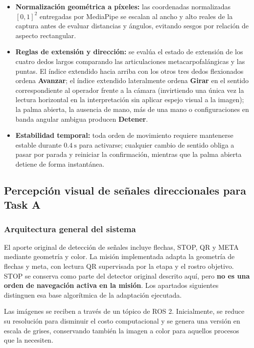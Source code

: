 \documentclass[11pt,a4paper]{article}
\begin{document}
\begin{itemize}
  \item \textbf{Normalización geométrica a píxeles:} las coordenadas
  normalizadas $[0,1]^2$ entregadas por MediaPipe se escalan al ancho y alto
  reales de la captura antes de evaluar distancias y ángulos, evitando sesgos
  por relación de aspecto rectangular.
  \item \textbf{Reglas de extensión y dirección:} se evalúa el estado de
  extensión de los cuatro dedos largos comparando las articulaciones
  metacarpofalángicas y las puntas. El índice extendido hacia arriba con los
  otros tres dedos flexionados ordena \textbf{Avanzar}; el índice extendido
  lateralmente ordena \textbf{Girar} en el sentido correspondiente al operador
  frente a la cámara (invirtiendo una única vez la lectura horizontal en la
  interpretación sin aplicar espejo visual a la imagen); la palma abierta, la
  ausencia de mano, más de una mano o configuraciones en banda angular ambigua
  producen \textbf{Detener}.
  \item \textbf{Estabilidad temporal:} toda orden de movimiento requiere
  mantenerse estable durante $0.4\ \mathrm{s}$ para activarse; cualquier cambio
  de sentido obliga a pasar por parada y reiniciar la confirmación, mientras que
  la palma abierta detiene de forma instantánea.
\end{itemize}

\subsection{Percepción visual de señales direccionales para Task A}

\subsubsection{Arquitectura general del sistema}

El aporte original de detección de señales incluye flechas, STOP, QR y META
mediante geometría y color. La misión implementada adapta la geometría de
flechas y meta, con lectura QR supervisada por la etapa y el rostro objetivo.
STOP se conserva como parte del detector original descrito aquí, pero
\textbf{no es una orden de navegación activa en la misión}. Los apartados
siguientes distinguen esa base algorítmica de la adaptación ejecutada.

Las imágenes se reciben a través de un tópico de ROS 2. Inicialmente, se reduce su resolución para disminuir el costo computacional y se genera una versión en escala de grises, conservando también la imagen a color para aquellos procesos que la necesiten.
\end{document}
